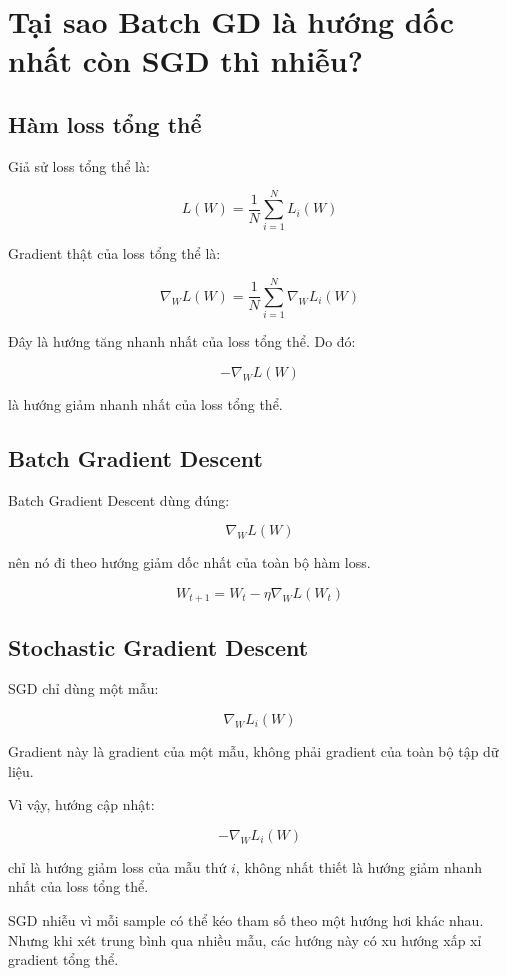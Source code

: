 \section{Tại sao Batch GD là hướng dốc nhất còn SGD thì nhiễu?}

\subsection{Hàm loss tổng thể}

Giả sử loss tổng thể là:

\[
    L(W)
    =
    \frac{1}{N}
    \sum_{i=1}^{N}
    L_i(W)
\]

Gradient thật của loss tổng thể là:

\[
    \nabla_W L(W)
    =
    \frac{1}{N}
    \sum_{i=1}^{N}
    \nabla_W L_i(W)
\]

Đây là hướng tăng nhanh nhất của loss tổng thể. Do đó:

\[
    -\nabla_W L(W)
\]

là hướng giảm nhanh nhất của loss tổng thể.

\subsection{Batch Gradient Descent}

Batch Gradient Descent dùng đúng:

\[
    \nabla_W L(W)
\]

nên nó đi theo hướng giảm dốc nhất của toàn bộ hàm loss.

\[
    W_{t+1}
    =
    W_t
    -
    \eta
    \nabla_W L(W_t)
\]

\subsection{Stochastic Gradient Descent}

SGD chỉ dùng một mẫu:

\[
    \nabla_W L_i(W)
\]

Gradient này là gradient của một mẫu, không phải gradient của toàn bộ tập dữ liệu.

Vì vậy, hướng cập nhật:

\[
    -\nabla_W L_i(W)
\]

chỉ là hướng giảm loss của mẫu thứ $i$, không nhất thiết là hướng giảm nhanh nhất của loss tổng thể.

\begin{luuy}
SGD nhiễu vì mỗi sample có thể kéo tham số theo một hướng hơi khác nhau. Nhưng khi xét trung bình qua nhiều mẫu, các hướng này có xu hướng xấp xỉ gradient tổng thể.
\end{luuy}

